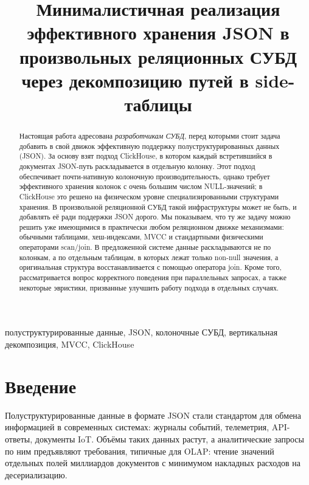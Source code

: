 \documentclass[conference,a4paper,10pt]{IEEEtran}
\begin{document}
\title{Минималистичная реализация эффективного хранения JSON в произвольных реляционных СУБД через декомпозицию путей в side-таблицы}

\author{
}

\maketitle

\begin{abstract}
Настоящая работа адресована \emph{разработчикам СУБД}, перед которыми
стоит задача добавить в свой движок эффективную поддержку
полу\-струк\-турированных данных (JSON). За основу взят подход
ClickHouse, в котором каждый встретившийся в документах JSON-путь
раскладывается в отдельную колонку. Этот подход обеспечивает
почти-нативную колоночную производительность, однако требует
эффективного хранения колонок с очень большим числом NULL-значений;
в ClickHouse это решено на физическом уровне специализированными
структурами хранения. В произвольной реляционной СУБД такой
инфраструктуры может не быть, и добавлять её ради поддержки JSON
дорого. Мы показываем, что ту же задачу можно решить уже
имеющимися в практически любом реляционном движке механизмами:
обычными таблицами, хеш-индексами, MVCC и стандартными физическими
операторами scan/join. В предложенной системе данные раскладываются
не по колонкам, а по отдельным таблицам, в которых лежат только
non-null значения, а оригинальная структура восстанавливается с
помощью оператора join. Кроме того, рассматривается вопрос корректного
поведения при параллельных запросах, а также некоторые эвристики,
призванные улучшить работу подхода в отдельных случаях.
\end{abstract}

\begin{IEEEkeywords}
полуструктурированные данные, JSON, колоночные СУБД,
вертикальная декомпозиция, MVCC, ClickHouse
\end{IEEEkeywords}


\section{Введение}
\label{sec:intro}

Полуструктурированные данные в формате JSON стали стандартом для
обмена информацией в современных системах: журналы событий,
телеметрия, API-ответы, документы IoT. Объёмы таких данных растут, а
аналитические запросы по ним предъявляют требования, типичные для
OLAP: чтение значений отдельных полей миллиардов документов с минимумом
накладных расходов на десериализацию.
\end{document}
